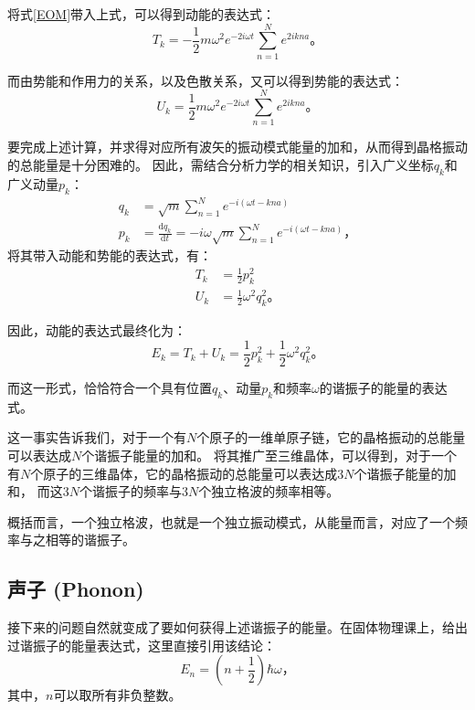 \documentclass[declarePage]{ecnuthesis}
\begin{document}
将式\ref{EOM}带入上式，可以得到动能的表达式：
\begin{equation}
    T_k=-\frac{1}{2}m\omega^2e^{-2i\omega t}\sum_{n=1}^{N}e^{2ikna} \text{。}
\end{equation}

而由势能和作用力的关系，以及色散关系，又可以得到势能的表达式：
\begin{equation}
    U_k=\frac{1}{2}m\omega^2e^{-2i\omega t}\sum_{n=1}^{N}e^{2ikna} \text{。}
\end{equation}

要完成上述计算，并求得对应所有波矢的振动模式能量的加和，从而得到晶格振动的总能量是十分困难的。%
因此，需结合分析力学的相关知识，引入广义坐标$q_k$和广义动量$p_k$：
\begin{align}
    q_k &= \sqrt{m}\sum_{n=1}^{N}e^{-i(\omega t-kna)} \\
    p_k &= \frac{\mathrm{d}q_k}{\mathrm{d}t} = -i\omega \sqrt{m}\sum_{n=1}^{N}e^{-i(\omega t-kna)} \text{，} 
\end{align}
将其带入动能和势能的表达式，有：
\begin{align}
    T_k &= \frac{1}{2}p_k^2 \\
    U_k &= \frac{1}{2}\omega^2q_k^2 \text{。} 
\end{align}

因此，动能的表达式最终化为：
\begin{equation}
    E_k=T_k+U_k=\frac{1}{2}p_k^2 + \frac{1}{2}\omega^2q_k^2 \text{。} 
\end{equation}

而这一形式，恰恰符合一个具有位置$q_k$、动量$p_k$和频率$\omega$的谐振子的能量的表达式。

这一事实告诉我们，对于一个有$N$个原子的一维单原子链，它的晶格振动的总能量可以表达成$N$个谐振子能量的加和。%
将其推广至三维晶体，可以得到，对于一个有$N$个原子的三维晶体，它的晶格振动的总能量可以表达成3$N$个谐振子能量的加和，%
而这3$N$个谐振子的频率与3$N$个独立格波的频率相等。

概括而言，一个独立格波，也就是一个独立振动模式，从能量而言，对应了一个频率与之相等的谐振子。

\subsection{声子 (Phonon)}

接下来的问题自然就变成了要如何获得上述谐振子的能量。在固体物理课上，给出过谐振子的能量表达式，这里直接引用该结论：
\begin{equation}
    E_n=(n + \frac{1}{2})\hbar \omega \text{，} \label{HO}
\end{equation}
其中，$n$可以取所有非负整数。
\end{document}
